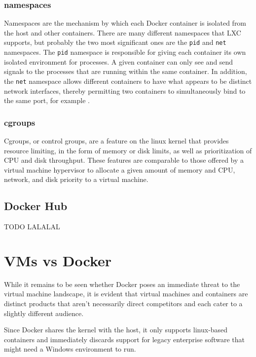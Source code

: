 \documentclass[\myfontsize, letterpaper]{article}
\begin{document}
\subsubsection{namespaces}
Namespaces are the mechanism by which each Docker container is isolated from the host and other containers. There are many different namespaces that LXC supports, but probably the two most significant ones are the \texttt{pid} and \texttt{net} namespaces. The \texttt{pid} namespace is responsible for giving each container its own isolated environment for processes. A given container can only see and send signals to the processes that are running within the same container. In addition, the \texttt{net} namespace allows different containers to have what appears to be distinct network interfaces, thereby permitting two containers to simultaneously bind to the same port, for example \cite{lxc}.



\subsubsection{cgroups}
Cgroups, or control groups, are a feature on the linux kernel that provides resource limiting, in the form of memory or disk limits, as well as prioritization of CPU and disk throughput. These features are comparable to those offered by a virtual machine hypervisor to allocate a given amount of memory and CPU, network, and disk priority to a virtual machine.

\subsection{Docker Hub}

TODO LALALAL


\section{VMs vs Docker}

While it remains to be seen whether Docker poses an immediate threat to the virtual machine landscape, it is evident that virtual machines and containers are distinct products that aren't necessarily direct competitors and each cater to a slightly different audience.

Since Docker shares the kernel with the host, it only supports linux-based containers and immediately discards support for legacy enterprise software that might need a Windows environment to run.
\end{document}
